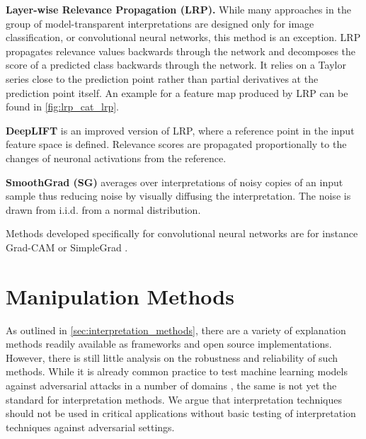 \documentclass[sigconf]{acmart}
\newcommand{\mypar}[1]{\vspace{0.2cm}\noindent\textbf{#1}}
\begin{document}
\mypar{Layer-wise Relevance Propagation (LRP).} While many approaches in the group of model-transparent interpretations are designed only for image classification, or convolutional neural networks, this method \cite{bach2015pixel} is an exception. LRP propagates relevance values backwards through the network and decomposes the score of a predicted class backwards through the network. It relies on a Taylor series close to the prediction point rather than partial derivatives at the prediction point itself. An example for a feature map produced by LRP can be found in \autoref{fig:lrp_cat_lrp}.

\mypar{DeepLIFT} \cite{shrikumar2017learning} is an improved version of LRP, where a reference point in the input feature space is defined. Relevance scores are propagated proportionally to the changes of neuronal activations from the reference. %

\mypar{SmoothGrad (SG)} \cite{smilkov2017smoothgrad} averages over interpretations of noisy copies of an input sample thus reducing noise by visually diffusing the interpretation. The noise is drawn from i.i.d. from a normal distribution. 

Methods developed specifically for convolutional neural networks are for instance Grad-CAM \cite{selvaraju2017grad} or SimpleGrad \cite{simonyan2013deep}.


% 
\section{Manipulation Methods}
\label{sec:manipulation_methods}

As outlined in \autoref{sec:interpretation_methods}, there are a variety of explanation methods readily available as frameworks and open source implementations. However, there is still little analysis on the robustness and reliability of such methods. 
While it is already common practice to test machine learning models against adversarial attacks in a number of domains \cite{gao2019universal, kereliuk2015deep}, the same is not yet the standard for interpretation methods. We argue that interpretation techniques should not be used in critical applications without basic testing of interpretation techniques against adversarial settings.
\end{document}
